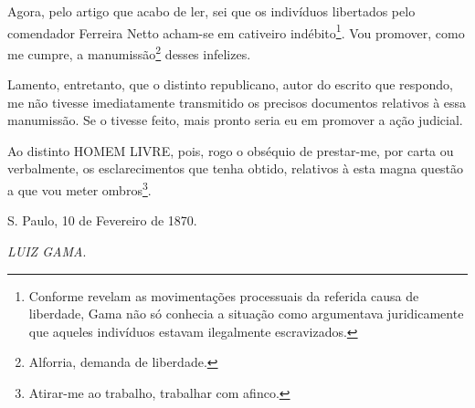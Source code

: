 Agora, pelo artigo que acabo de ler, sei que os indivíduos libertados
pelo comendador Ferreira Netto acham-se em cativeiro indébito\footnote{Conforme revelam as movimentações processuais da referida causa de
  liberdade, Gama não só conhecia a situação como argumentava
  juridicamente que aqueles indivíduos estavam ilegalmente escravizados.}.
Vou promover, como me cumpre, a manumissão\footnote{Alforria, demanda
  de liberdade.} desses infelizes.

Lamento, entretanto, que o distinto republicano, autor do escrito que
respondo, me não tivesse imediatamente transmitido os precisos
documentos relativos à essa manumissão. Se o tivesse feito, mais pronto
seria eu em promover a ação judicial.

Ao distinto HOMEM LIVRE, pois, rogo o obséquio de prestar-me, por carta
ou verbalmente, os esclarecimentos que tenha obtido, relativos à esta
magna questão a que vou meter ombros\footnote{Atirar-me ao trabalho,
  trabalhar com afinco.}.

S. Paulo, 10 de Fevereiro de 1870.

\emph{LUIZ GAMA}.

\pagebreak
\mbox{}\vfill
\thispagestyle{empty}

